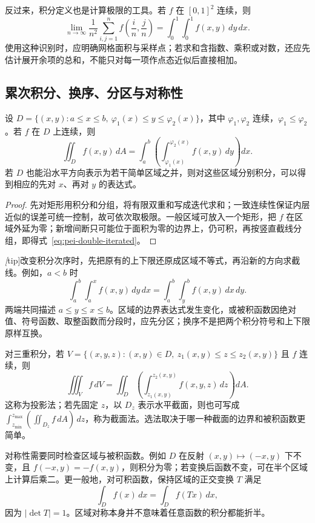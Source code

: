 反过来，积分定义也是计算极限的工具。若 $f$ 在 $[0,1]^2$ 连续，则
\[
\lim_{n\to\infty}\frac1{n^2}\sum_{i,j=1}^n
f\!\left(\frac in,\frac jn\right)=\int_0^1\!\int_0^1f(x,y)\,dy\,dx.
\]
使用这种识别时，应明确网格面积与采样点；若求和含指数、乘积或对数，还应先估计展开余项的总和，不能只对每一项作点态近似后直接相加。

\subsection{累次积分、换序、分区与对称性}

\begin{theorem}
\label{thm:pei-proper-fubini}
设 $D=\{(x,y):a\le x\le b,\ \varphi_1(x)\le y\le\varphi_2(x)\}$，其中 $\varphi_1,\varphi_2$ 连续，$\varphi_1\le\varphi_2$。若 $f$ 在 $D$ 上连续，则
\begin{equation}
\label{eq:pei-double-iterated}
\iint_Df(x,y)\,dA
=\int_a^b\left(\int_{\varphi_1(x)}^{\varphi_2(x)}f(x,y)\,dy\right)dx.
\end{equation}
若 $D$ 也能沿水平方向表示为若干简单区域之并，则对这些区域分别积分，可以得到相应的先对 $x$、再对 $y$ 的表达式。
\end{theorem}
\begin{proof}
先对矩形用积分和分组，将有限双重和写成迭代求和；一致连续性保证内层近似的误差可统一控制，故可依次取极限。一般区域可放入一个矩形，把 $f$ 在区域外延为零；新增间断只可能位于面积为零的边界上，仍可积，再按竖直截线分组，即得式~\eqref{eq:pei-double-iterated}。
\end{proof}

\emph[tip]{改变积分次序时，先把原有的上下限还原成区域不等式，再沿新的方向求截线}。例如，$a<b$ 时
\begin{equation}
\label{eq:pei-triangle-interchange}
\int_a^b\!\int_a^x f(x,y)\,dy\,dx
=\int_a^b\!\int_y^b f(x,y)\,dx\,dy.
\end{equation}
两端共同描述 $a\le y\le x\le b$。区域的边界表达式发生变化，或被积函数因绝对值、符号函数、取整函数而分段时，应先分区；换序不是把两个积分符号和上下限原样互换。

对三重积分，若 $V=\{(x,y,z):(x,y)\in D,\ z_1(x,y)\le z\le z_2(x,y)\}$ 且 $f$ 连续，则
\[
\iiint_Vf\,dV=\iint_D\!\left(\int_{z_1(x,y)}^{z_2(x,y)}f(x,y,z)\,dz\right)dA.
\]
这称为投影法；若先固定 $z$，以 $D_z$ 表示水平截面，则也可写成
$\int_{z_{\min}}^{z_{\max}}(\iint_{D_z}f\,dA)\,dz$，称为截面法。选法取决于哪一种截面的边界和被积函数更简单。

对称性需要同时检查区域与被积函数。例如 $D$ 在反射 $(x,y)\mapsto(-x,y)$ 下不变，且 $f(-x,y)=-f(x,y)$，则积分为零；若变换后函数不变，可在半个区域上计算后乘二。更一般地，对可积函数，保持区域的正交变换 $T$ 满足
\[
\int_D f(x)\,dx=\int_D f(Tx)\,dx,
\]
因为 $|\det T|=1$。区域对称本身并不意味着任意函数的积分都能折半。

